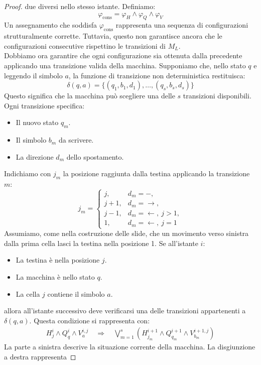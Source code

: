 \begin{proof}
due diversi nello stesso istante. Definiamo:
\[
\boxed{
\varphi_{\text{cons}}=
\varphi_H\land\varphi_Q\land\varphi_V
}
\]
Un assegnamento che soddisfa
$\varphi_{\text{cons}}$ rappresenta una sequenza
di configurazioni strutturalmente corrette.
Tuttavia, questo non garantisce ancora che
le configurazioni consecutive rispettino
le transizioni di $M_L$.\smallskip\\
Dobbiamo ora garantire che ogni configurazione
sia ottenuta dalla precedente applicando
una transizione valida della macchina.
Supponiamo che, nello stato $q$ e leggendo
il simbolo $a$, la funzione di transizione
non deterministica restituisca:
\[
\delta(q,a)=
\{
(q_1,b_1,d_1),\ldots,(q_s,b_s,d_s)
\}
\]
Questo significa che la macchina può scegliere
una delle $s$ transizioni disponibili.
Ogni transizione specifica:
\begin{itemize}
    \item Il nuovo stato $q_m$.
    \item Il simbolo $b_m$ da scrivere.
    \item La direzione $d_m$ dello spostamento.
\end{itemize}
Indichiamo con $j_m$ la posizione raggiunta
dalla testina applicando la transizione $m$:
\[
j_m=
\begin{cases}
j, & d_m=-,\\
j+1, & d_m=\rightarrow,\\
j-1, & d_m=\leftarrow,\ j>1,\\
1, & d_m=\leftarrow,\ j=1
\end{cases}
\]
Assumiamo, come nella costruzione delle slide,
che un movimento verso sinistra dalla prima cella
lasci la testina nella posizione 1.
Se all'istante $i$:
\begin{itemize}
    \item La testina è nella posizione $j$.
    \item La macchina è nello stato $q$.
    \item La cella $j$ contiene il simbolo $a$.
\end{itemize}
allora all'istante successivo deve verificarsi
una delle transizioni appartenenti a $\delta(q,a)$.
Questa condizione si rappresenta con:
\[
\begin{aligned}
H_j^i\land Q_q^i\land V_a^{i,j}
\quad\Rightarrow\quad
\bigvee_{m=1}^{s}
\left(
H_{j_m}^{i+1}
\land Q_{q_m}^{i+1}
\land V_{b_m}^{i+1,j}
\right)
\end{aligned}
\]
La parte a sinistra descrive la situazione
corrente della macchina.
La disgiunzione a destra rappresenta

\end{proof}
